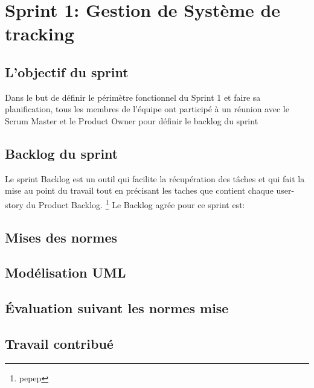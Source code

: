 \section{Sprint 1: Gestion de Système de tracking}

\subsection{L'objectif du sprint}
Dans le but de définir le périmètre fonctionnel du Sprint 1 et faire
sa planification, tous les membres de l'équipe ont participé à un réunion
avec le Scrum Master et le Product Owner pour définir le backlog du sprint 
\subsection{Backlog du sprint}
Le sprint Backlog est un outil qui facilite la récupération des tâches et qui fait
la mise au point du travail tout en précisant les taches que contient chaque 
user-story du Product Backlog.
\footnote{pepep}
Le Backlog agrée pour ce sprint est:
\subsection{Mises des normes}
\subsection{Modélisation UML}
\subsection{Évaluation suivant les normes mise}
\subsection{Travail contribué}

